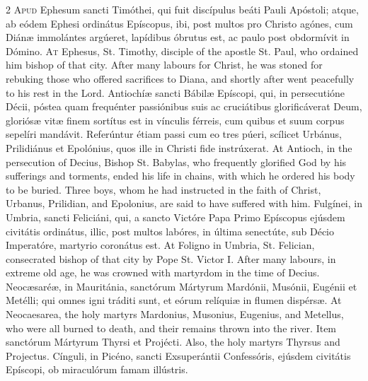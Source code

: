 \begin{paracol}{2}
\lettrine[lines=2]{A}{pud} Ephesum sancti Timóthei, qui fuit 
 discípulus beáti Pauli Apóstoli; atque, ab eódem Ephesi ordinátus Epíscopus, 
 ibi, post multos pro Christo agónes, cum Diánæ immolántes argúeret, 
 lapídibus óbrutus est, ac paulo post obdormívit in Dómino.
\switchcolumn
{}
\lettrine[lines=2]{A}{t} Ephesus, St. Timothy, disciple of the apostle St. Paul, who ordained him 
 bishop of that city. After many labours for Christ, he was stoned for 
 rebuking those who offered sacrifices to Diana, and shortly after went 
 peacefully to his rest in the Lord.
\switchcolumn*
{}
Antiochíæ sancti Bábilæ Epíscopi, qui, in 
 persecutióne Décii, póstea quam frequénter passiónibus suis ac cruciátibus 
 glorificáverat Deum, gloriósæ vitæ finem sortítus est in vínculis férreis, 
 cum quibus et suum corpus sepelíri mandávit. Referúntur étiam passi 
 cum eo tres púeri, scílicet Urbánus, Prilidiánus et Epolónius, quos ille in 
 Christi fide instrúxerat.
\switchcolumn
{}
At Antioch, in the persecution of Decius, Bishop St. Babylas, who frequently 
 glorified God by his sufferings and torments, ended his life in chains, with 
 which he ordered his body to be buried. Three boys, whom he had 
 instructed in the faith of Christ, Urbanus, Prilidian, and Epolonius, are 
 said to have suffered with him.
\switchcolumn*
{}
Fulgínei, in Umbria, sancti Feliciáni, qui, a sancto Victóre Papa Primo 
 Epíscopus ejúsdem civitátis ordinátus, illic, post multos labóres, in 
 última senectúte, sub Décio Imperatóre, martyrio coronátus est.
\switchcolumn
{}
At Foligno in Umbria, St. Felician, consecrated bishop of that city by Pope 
 St. Victor I. After many labours, in extreme old age, he was crowned 
 with martyrdom in the time of Decius.
\switchcolumn*
{}
Neocæsaréæ, in Mauritánia, sanctórum Mártyrum 
 Mardónii, Musónii, Eugénii et Metélli; qui omnes igni tráditi sunt, et eórum 
 relíquiæ in flumen dispérsæ.
\switchcolumn
{}
At Neocaesarea, the holy martyrs Mardonius, Musonius, Eugenius, and Metellus, 
 who were all burned to death, and their remains thrown into the river.
\switchcolumn*
{}
Item sanctórum Mártyrum Thyrsi et Projécti.
\switchcolumn
{}
Also, the holy martyrs Thyrsus and Projectus.
\switchcolumn*
{}
Cínguli, in Picéno, sancti Exsuperántii 
 Confessóris, ejúsdem civitátis Epíscopi, ob miraculórum famam illústris.

\end{paracol}
